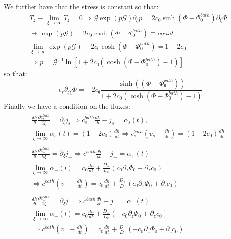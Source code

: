 \documentclass[12pt]{extarticle}
\begin{document}
We further have that the stress is constant so that:
\begin{equation}
\begin{aligned}
T_z \equiv\lim_{\xi\rightarrow\infty}T_z=0 \Rightarrow \mathcal{G}\exp(p\mathcal{G})\partial_\xi p= 2c_0\sinh(\Phi-\Phi_0^{bath})\partial_\xi \Phi\\
\Rightarrow \exp(p\mathcal{G})-2c_0\cosh(\Phi-\Phi_0^{bath})\equiv const\\
\lim_{\xi\rightarrow\infty}\exp(p\mathcal{G})-2c_0\cosh(\Phi-\Phi_0^{bath}) =1-2c_0\\
 \Rightarrow p = \mathcal{G}^{-1}\ln\left[1+2c_0\left(\cosh(\Phi-\Phi_0^{bath})-1\right)\right] 
\end{aligned}
\end{equation}
so that:
\begin{equation}
-\epsilon_r\partial_{\xi\xi} \Phi =-2c_0 \frac{\sinh((\Phi-\Phi_0^{bath}))}{1+2c_0\left(\cosh(\Phi-\Phi_0^{bath})-1\right)}
\end{equation}
Finally we have a condition on the fluxes:
\begin{eqnarray}
\begin{aligned}
\frac{dh}{dt}\frac{\partial c^{bath}_s}{\partial \xi}=  \partial_\xi j_s \Rightarrow c^{bath}_s \frac{dh}{dt}-j_s=\alpha_s(t),\\
\lim_{\xi\rightarrow\infty} \alpha_s(t) = (1-2c_0)\frac{dh}{dt} \Rightarrow  c^{bath}_s \left(v_s-\frac{dh}{dt}\right)=(1-2c_0)\frac{dh}{dt}
\end{aligned}\\[4mm]
\begin{aligned}
\frac{dh}{dt}\frac{\partial c^{bath}_+}{\partial \xi}= \partial_\xi j_+\Rightarrow c^{bath}_+ \frac{dh}{dt}-j_+=\alpha_{+}(t)\\
\lim_{\xi\rightarrow\infty} \alpha_+(t) = c_0 \frac{dh}{dt}  +\frac{D_+}{D_0}\left(c_0 \partial_z \Phi_0+\partial_z c_0\right) \\
\Rightarrow  c^{bath}_+ \left(v_+-\frac{dh}{dt}\right)=c_0 \frac{dh}{dt}  +\frac{D_+}{D_0}\left(c_0 \partial_z \Phi_0+\partial_z c_0\right)
\end{aligned}\\[4mm]
\begin{aligned}
\frac{dh}{dt}\frac{\partial c^{bath}_-}{\partial \xi}= \partial_\xi j_-\Rightarrow c^{bath}_- \frac{dh}{dt}-j_-=\alpha_{-}(t)\\
\lim_{\xi\rightarrow\infty} \alpha_-(t) = c_0 \frac{dh}{dt}  +\frac{D_-}{D_0}\left(-c_0 \partial_z \Phi_0+\partial_z c_0\right) \\
\Rightarrow  c^{bath}_- \left(v_--\frac{dh}{dt}\right)=c_0 \frac{dh}{dt}  +\frac{D_-}{D_0}\left(-c_0 \partial_z \Phi_0+\partial_z c_0\right)
\end{aligned}\\
\end{eqnarray}
\end{document}
